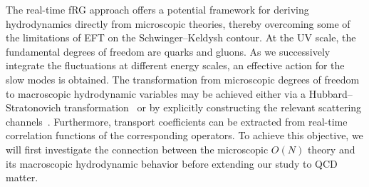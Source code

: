 \documentclass[letterpaper,11pt]{article}
\begin{document}
The real-time fRG approach offers a potential framework for deriving hydrodynamics directly from microscopic theories, thereby overcoming some of the limitations of EFT on the Schwinger–Keldysh contour. At the UV scale, the fundamental degrees of freedom are quarks and gluons. As we successively integrate the fluctuations at different energy scales, an effective action for the slow modes is obtained. The transformation from microscopic degrees of freedom to macroscopic hydrodynamic variables may be achieved either via a Hubbard–Stratonovich transformation~\cite{Fu:2019hdw} or by explicitly constructing the relevant scattering channels~\cite{Fu:2025hcm}. Furthermore, transport coefficients can be extracted from real-time correlation functions of the corresponding operators. To achieve this objective, we will first investigate the connection between the microscopic $O(N)$ theory and its macroscopic hydrodynamic behavior before extending our study to QCD matter.
\end{document}
